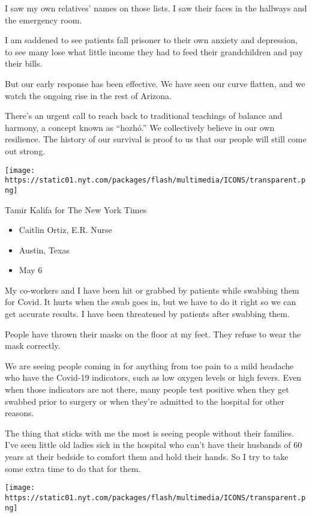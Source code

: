 I saw my own relatives' names on those lists. I saw their faces in the
hallways and the emergency room.

I am saddened to see patients fall prisoner to their own anxiety and
depression, to see many lose what little income they had to feed their
grandchildren and pay their bills.

But our early response has been effective. We have seen our curve
flatten, and we watch the ongoing rise in the rest of Arizona.

There's an urgent call to reach back to traditional teachings of balance
and harmony, a concept known as ``hozhó.'' We collectively believe in
our own resilience. The history of our survival is proof to us that our
people will still come out strong.

\texttt{[image: https://static01.nyt.com/packages/flash/multimedia/ICONS/transparent.png]}

Tamir Kalifa for The New York Times

\begin{itemize}
\tightlist
\item
  Caitlin Ortiz, E.R. Nurse
\item
  Austin, Texas
\item
  May 6
\end{itemize}

My co-workers and I have been hit or grabbed by patients while swabbing
them for Covid. It hurts when the swab goes in, but we have to do it
right so we can get accurate results. I have been threatened by patients
after swabbing them.

People have thrown their masks on the floor at my feet. They refuse to
wear the mask correctly.

We are seeing people coming in for anything from toe pain to a mild
headache who have the Covid-19 indicators, such as low oxygen levels or
high fevers. Even when those indicators are not there, many people test
positive when they get swabbed prior to surgery or when they're admitted
to the hospital for other reasons.

The thing that sticks with me the most is seeing people without their
families. I've seen little old ladies sick in the hospital who can't
have their husbands of 60 years at their bedside to comfort them and
hold their hands. So I try to take some extra time to do that for them.

\texttt{[image: https://static01.nyt.com/packages/flash/multimedia/ICONS/transparent.png]}

